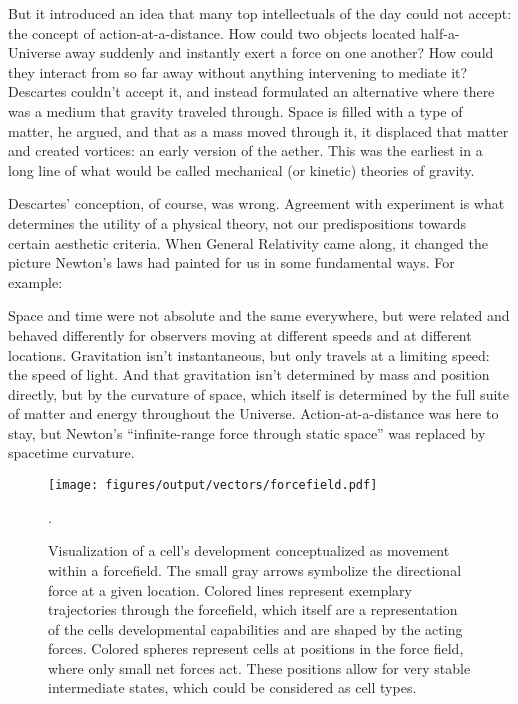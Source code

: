 But it introduced an idea that many top intellectuals of the day could not accept: the concept of action-at-a-distance. How could two objects located half-a-Universe away suddenly and instantly exert a force on one another? How could they interact from so far away without anything intervening to mediate it? Descartes couldn’t accept it, and instead formulated an alternative where there was a medium that gravity traveled through. Space is filled with a type of matter, he argued, and that as a mass moved through it, it displaced that matter and created vortices: an early version of the aether. This was the earliest in a long line of what would be called mechanical (or kinetic) theories of gravity.

Descartes’ conception, of course, was wrong. Agreement with experiment is what determines the utility of a physical theory, not our predispositions towards certain aesthetic criteria. When General Relativity came along, it changed the picture Newton’s laws had painted for us in some fundamental ways. For example:

Space and time were not absolute and the same everywhere, but were related and behaved differently for observers moving at different speeds and at different locations.
Gravitation isn’t instantaneous, but only travels at a limiting speed: the speed of light.
And that gravitation isn’t determined by mass and position directly, but by the curvature of space, which itself is determined by the full suite of matter and energy throughout the Universe.
Action-at-a-distance was here to stay, but Newton’s “infinite-range force through static space” was replaced by spacetime curvature.

\begin{figure}[!ht] 
	\centering
	\texttt{[image: figures/output/vectors/forcefield.pdf]} 
	\caption{Visualization of a cell's development conceptualized as movement within a forcefield. The small gray arrows symbolize the directional force at a given location. Colored lines represent exemplary trajectories through the forcefield, which itself are a representation of the cells developmental capabilities and are shaped by the acting forces. Colored spheres represent cells at positions in the force field, where only small net forces act. These positions allow for very stable intermediate states, which could be considered as cell types.}
	\label{fig:forcefieldcell}.
\end{figure}
 

\cite{Wilson2004,Klimmeck2012,Cabezas-Wallscheid2013,Cabezas-Wallscheid2014,Klimmeck2014}

